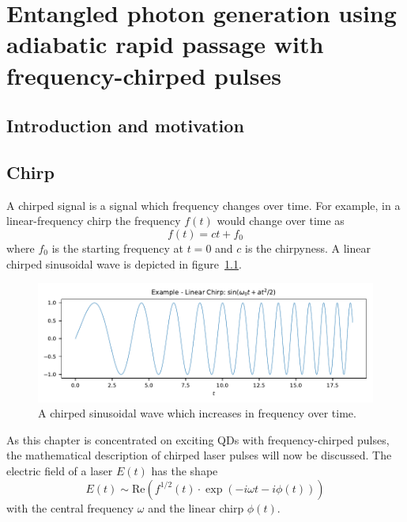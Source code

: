 \chapter{Entangled photon generation using adiabatic rapid passage with frequency-chirped pulses}
\label{cha:chirp}

\section{Introduction and motivation}

\section{Chirp}
\label{sec:chirp}
A chirped signal is a signal which frequency changes over time.
For example, in a linear-frequency chirp the frequency $f(t)$ would change over time as
\begin{equation}
f(t) = ct+f_0
\end{equation}
where $f_0$ is the starting frequency at $t=0$ and $c$ is the chirpyness. A linear chirped sinusoidal wave is depicted in figure~\ref{fig:chirped-sin}.

\begin{figure}[H]
	\centering
	\includegraphics[width=\linewidth]{figures/chirp/plots/chirped-sin}
	\caption{A chirped sinusoidal wave which increases in frequency over time.}
	\label{fig:chirped-sin}
\end{figure}

As this chapter is concentrated on exciting \acp{QD} with frequency-chirped pulses, the mathematical description of chirped laser pulses will now be discussed. The electric field of a laser $E(t)$ has the shape
\begin{equation}
\label{eq:electric-field-laser}
E(t) \sim \mathrm{Re}\left(f^{1/2}(t) \cdot \exp\left(-i \omega t - i \phi(t)\right)\right)
\end{equation}
with the central frequency $\omega$ and the linear chirp $\phi(t)$.


